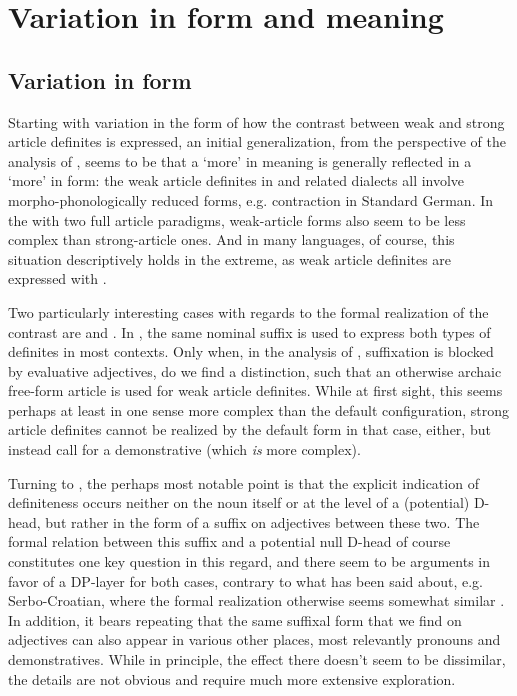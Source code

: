 \documentclass[output=paper
,modfonts
,nonflat]{langscibook}
\begin{document}
\section{Variation in form and meaning}

\subsection{Variation in form}

Starting with variation in the form of how the contrast between
weak and strong article definites is expressed, an initial
generalization, from the perspective of the analysis of
\citet{Schwarz2009}, seems to be that a `more' in meaning is generally
reflected in a `more' in form: the weak article definites in 
and related dialects all involve morpho-phonologically reduced forms,
e.g. contraction in Standard German. In the  with
two full article paradigms, weak-article forms
also seem to be less complex than strong-article ones. And in many
languages, of course, this situation descriptively holds in the
extreme, as weak article definites are expressed with . 

Two particularly interesting cases with regards to the formal
realization of the contrast are  and . In
, the same nominal suffix is used to express both types of
definites in most contexts. Only when, in the analysis of
\citet{Ingason2016}, suffixation is blocked by evaluative adjectives,
do we find a distinction, such that an otherwise archaic free-form
article is used for weak article definites. While at first sight, this
seems perhaps at least in one sense more complex than the default
configuration, strong article definites cannot be realized by the
default form in that case, either, but instead call for a
demonstrative (which \textit{is} more complex). 

Turning to , the perhaps most notable point is that the
explicit indication of definiteness occurs neither on the noun itself
or at the level of a (potential) D-head, but rather in the form of a suffix on
adjectives between these two. The formal relation between this
suffix and a potential null D-head of course constitutes one key
question in this regard, and there seem to be arguments in favor of a
DP-layer for both cases, contrary to what has been said about,
e.g. Serbo-Croatian, where the formal realization otherwise seems
somewhat similar \citep{Sereikaite2016}. In addition, it bears
repeating that the same suffixal form that we find on adjectives can
also appear in various other places, most relevantly pronouns and
demonstratives. While in principle, the effect there doesn't seem to
be dissimilar, the details are not obvious and require much more
extensive exploration.
\end{document}
